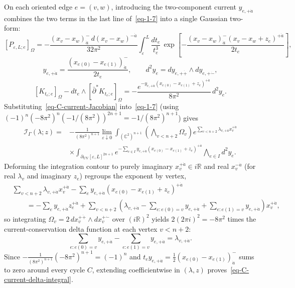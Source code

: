\documentclass[11pt]{article}
\numberwithin{equation}{section}
\numberwithin{figure}{section}
\numberwithin{table}{section}
\begin{document}
On each oriented edge $e=(v,w)$, introducing the two-component current $y_{e,+\dot a}$ combines the two terms in the last line of~\eqref{eq-1-7} into a single Gaussian two-form:
\begin{equation}\label{eq-C-explicit-propagator}
[P_{\varepsilon,L;e}]_\Omega
=-\frac{(x_v-x_w)^-_{\dot a}\,d(x_v-x_w)^{-\dot a}}{32\pi^2}
 \int_\varepsilon^L\frac{dt_e}{t_e^3}\,
 \exp\!\left[-\frac{(x_v-x_w)^-_{\dot a}(x_v-x_w+z_e)^{+\dot a}}{2t_e}\right],
\end{equation}
\begin{equation}\label{eq-1-8}
y_{e,+\dot a}
=\frac{(x_{e(0)}-x_{e(1)})^-_{\dot a}}{2t_e},\qquad
 d^2y_e=dy_{e,+\dot+}\wedge dy_{e,+\dot-},
\end{equation}
\begin{equation}\label{eq-C-current-Jacobian}
[K_{t_e;e}]_\Omega
-dt_e\wedge[\bar\partial^*K_{t_e;e}]_\Omega
=-\frac{e^{-y_{e,+\dot a}(x_{e(0)}-x_{e(1)}+z_e)^{+\dot a}}}{8\pi^2}\,d^2y_e.
\end{equation}
Substituting~\eqref{eq-C-current-Jacobian} into~\eqref{eq-1-7} (using $(-1)^n(-8\pi^2)^n(-1/(8\pi^2))^{2n+1}=-1/(8\pi^2)^{n+1}$) gives
\begin{equation}\label{eq-kernel-current-form}
\begin{aligned}
\mathcal I_\Gamma(\lambda;z)
={}&-\frac{1}{(8\pi^2)^{n+1}}\lim_{\varepsilon\downarrow0}
\int_{(\mathbb C^2)^{n+1}}
\left(\bigwedge_{v<n+2}\Omega_v\right)
e^{\sum_{v<n+2}\lambda_{v,+\dot a}x_v^{+\dot a}}\\
&\times\int_{\partial_{\mathrm{UV}}[\varepsilon,L]^{2n+1}}
e^{-\sum_{e\in I}y_{e,+\dot a}(x_{e(0)}-x_{e(1)}+z_e)^{+\dot a}}
\bigwedge_{e\in I}d^2y_e.
\end{aligned}
\end{equation}
Deforming the integration contour to purely imaginary $x_v^{+\dot a}\in i\mathbb R$ and real $x_v^{-\dot a}$ (for real $\lambda_v$ and imaginary $z_e$) regroups the exponent by vertex,
\begin{equation}\label{eq-C-fourier-exponent}
\begin{aligned}
&\sum_{v<n+2}\lambda_{v,+\dot a}x_v^{+\dot a}
-\sum_ey_{e,+\dot a}(x_{e(0)}-x_{e(1)}+z_e)^{+\dot a}\\
&\qquad=-\sum_ey_{e,+\dot a}z_e^{+\dot a}
+\sum_{v<n+2}\left(\lambda_{v,+\dot a}
-\sum_{e:e(0)=v}y_{e,+\dot a}
+\sum_{e:e(1)=v}y_{e,+\dot a}\right)x_v^{+\dot a},
\end{aligned}
\end{equation}
so integrating $\Omega_v=2\,dx_v^{+\dot+}\wedge dx_v^{+\dot-}$ over $(i\mathbb R)^2$ yields $2(2\pi i)^2=-8\pi^2$ times the current-conservation delta function at each vertex $v<n+2$:
\begin{equation}\label{eq-1-9}
\sum_{e:e(0)=v}y_{e,+\dot a}
-\sum_{e:e(1)=v}y_{e,+\dot a}
=\lambda_{v,+\dot a}.
\end{equation}
Since $-\frac{1}{(8\pi^2)^{n+1}}(-8\pi^2)^{n+1}=(-1)^n$ and $t_ey_{e,+\dot a}=\tfrac12(x_{e(0)}-x_{e(1)})^-_{\dot a}$ sums to zero around every cycle $C$, extending coefficientwise in $(\lambda,z)$ proves~\eqref{eq-C-current-delta-integral}.
\end{document}
